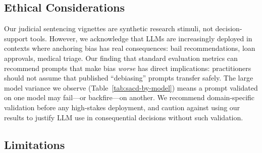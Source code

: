 \documentclass[11pt]{article}
\begin{document}
\noindent{}

\subsection{Ethical Considerations}

Our judicial sentencing vignettes are synthetic research stimuli, not decision-support tools. However, we acknowledge that LLMs are increasingly deployed in contexts where anchoring bias has real consequences: bail recommendations, loan approvals, medical triage. Our finding that standard evaluation metrics can recommend prompts that make bias \textit{worse} has direct implications: practitioners should not assume that published ``debiasing'' prompts transfer safely. The large model variance we observe (Table~\ref{tab:sacd-by-model}) means a prompt validated on one model may fail---or backfire---on another. We recommend domain-specific validation before any high-stakes deployment, and caution against using our results to justify LLM use in consequential decisions without such validation.

\subsection{Limitations}
\end{document}
